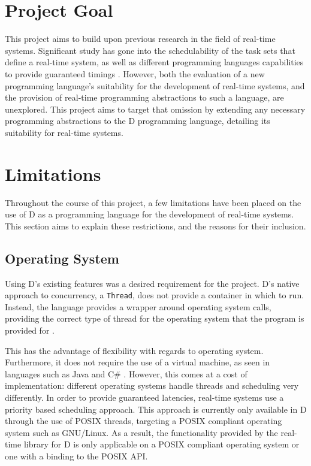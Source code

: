 \section{Project Goal} %
This project aims to build upon previous research in the field of real-time systems. 
Significant study has gone into the schedulability of the task sets that 
define a real-time system, as well as different programming languages capabilities 
to provide guaranteed timings \cite{burns-sched-analysis,atc-article}. 
However, both the evaluation of a new programming language's suitability for the 
development of real-time systems, and the provision of real-time programming 
abstractions to such a language, are unexplored. 
This project aims to target that 
omission by extending any necessary programming abstractions to the D programming 
language, detailing its suitability for real-time systems.
\section{Limitations} %
Throughout the course of this project, a few limitations have been placed on the 
use of D as a programming language for the development of real-time systems. 
This section aims to explain these restrictions, and the reasons for
their inclusion.
\subsection{Operating System}
Using D's existing features was a desired requirement for the project. 
D's native approach to concurrency, a \texttt{Thread}, does not provide a
container in which to run. 
Instead, the language provides a wrapper around operating system calls, 
providing the correct type of thread for the operating system
that the program is provided for \cite{github-core-thread}. 
\par\bigskip\noindent
This has the advantage of flexibility with regards to operating system.
Furthermore, it does not require the use of a virtual machine, as seen in languages such as 
Java and C\# \cite{zhang2007exploiting}. However, this comes at a cost of implementation: 
different operating systems handle threads and scheduling very differently. 
In order to provide guaranteed latencies, real-time systems use a priority based 
scheduling approach. This approach is currently only available in D through the use of 
POSIX threads, targeting a POSIX compliant operating system such as GNU/Linux. 
As a result, the functionality provided by the real-time library for D is only 
applicable on a POSIX compliant operating system or one with a binding to the POSIX 
API.

